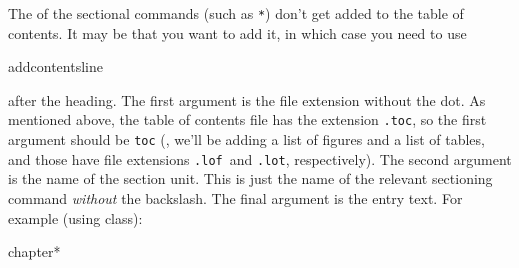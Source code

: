 
The  of the sectional 
commands (such as \texttt{*})
don't get added to the table of contents. It may be that you want to
add it, in which case you need to use
\begin{definition}
\gls{addcontentsline}
\end{definition}
after the heading. The first argument  is the file
extension without the dot. As mentioned above, the table of contents
file has the extension \texttt{.toc}, so the first argument should
be \texttt{toc} (, 
we'll be adding a list of figures and a list of tables, and those
have file extensions \texttt{.lof}\indexLOF\ and \texttt{.lot}\indexLOT, respectively).
The second argument  is the name of the section
unit. This is just the name of the relevant sectioning command
\emph{without} the backslash. The final argument  is the
entry text. For example (using  class):
\begin{code}
\gls{chapter}*\newline
{}
\end{code}

